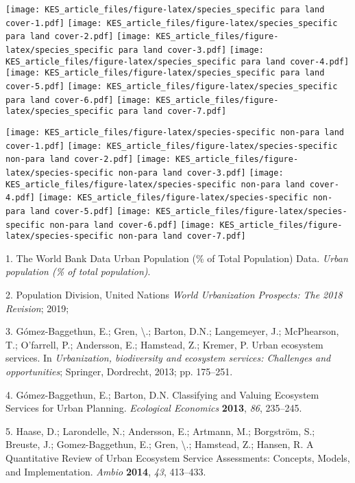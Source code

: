 \documentclass[
]{article}
\begin{document}
\texttt{[image: KES\_article\_files/figure-latex/species\_specific para land cover-1.pdf]} \texttt{[image: KES\_article\_files/figure-latex/species\_specific para land cover-2.pdf]} \texttt{[image: KES\_article\_files/figure-latex/species\_specific para land cover-3.pdf]} \texttt{[image: KES\_article\_files/figure-latex/species\_specific para land cover-4.pdf]} \texttt{[image: KES\_article\_files/figure-latex/species\_specific para land cover-5.pdf]} \texttt{[image: KES\_article\_files/figure-latex/species\_specific para land cover-6.pdf]} \texttt{[image: KES\_article\_files/figure-latex/species\_specific para land cover-7.pdf]}

\texttt{[image: KES\_article\_files/figure-latex/species-specific non-para land cover-1.pdf]} \texttt{[image: KES\_article\_files/figure-latex/species-specific non-para land cover-2.pdf]} \texttt{[image: KES\_article\_files/figure-latex/species-specific non-para land cover-3.pdf]} \texttt{[image: KES\_article\_files/figure-latex/species-specific non-para land cover-4.pdf]} \texttt{[image: KES\_article\_files/figure-latex/species-specific non-para land cover-5.pdf]} \texttt{[image: KES\_article\_files/figure-latex/species-specific non-para land cover-6.pdf]} \texttt{[image: KES\_article\_files/figure-latex/species-specific non-para land cover-7.pdf]}

\hypertarget{refs}{}
\leavevmode\hypertarget{ref-the_world_bank_data_urban_nodate}{}%
1. The World Bank Data Urban Population (\% of Total Population) Data. \emph{Urban population (\% of total population)}.

\leavevmode\hypertarget{ref-population_division_united_nations_world_2019}{}%
2. Population Division, United Nations \emph{World Urbanization Prospects: The 2018 Revision}; 2019;

\leavevmode\hypertarget{ref-gomez-baggethun_urban_2013}{}%
3. Gómez-Baggethun, E.; Gren, \textbackslash.; Barton, D.N.; Langemeyer, J.; McPhearson, T.; O'farrell, P.; Andersson, E.; Hamstead, Z.; Kremer, P. Urban ecosystem services. In \emph{Urbanization, biodiversity and ecosystem services: Challenges and opportunities}; Springer, Dordrecht, 2013; pp. 175--251.

\leavevmode\hypertarget{ref-gomez-baggethun_classifying_2013}{}%
4. Gómez-Baggethun, E.; Barton, D.N. Classifying and Valuing Ecosystem Services for Urban Planning. \emph{Ecological Economics} \textbf{2013}, \emph{86}, 235--245.

\leavevmode\hypertarget{ref-haase_quantitative_2014}{}%
5. Haase, D.; Larondelle, N.; Andersson, E.; Artmann, M.; Borgström, S.; Breuste, J.; Gomez-Baggethun, E.; Gren, \textbackslash.; Hamstead, Z.; Hansen, R. A Quantitative Review of Urban Ecosystem Service Assessments: Concepts, Models, and Implementation. \emph{Ambio} \textbf{2014}, \emph{43}, 413--433.
\end{document}
